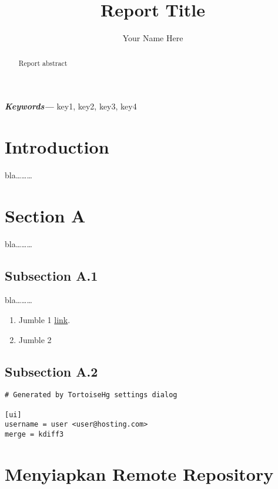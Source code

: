 \documentclass[]{article}
\title{Report Title}
\author{Your Name Here}
\providecommand{\keywords}[1]{\textbf{\textit{Keywords---}} #1}
\begin{document}
\maketitle
\begin{abstract}
  Report abstract
\end{abstract}
\keywords{key1, key2, key3, key4}

\tableofcontents
\newpage

\section{Introduction}
bla\dots\dots\dots

\section{Section A}
bla\dots\dots\dots

\subsection{Subsection A.1}
bla\dots\dots\dots
\begin{enumerate}
  \item Jumble 1
    \href{http://tortoisehg.bitbucket.org/download/}{link}.
  \item Jumble 2
\end{enumerate}

\subsection{Subsection A.2}

\begin{lstlisting}[style=bash]
# Generated by TortoiseHg settings dialog

[ui]
username = user <user@hosting.com>
merge = kdiff3
\end{lstlisting}

\clearpage
\section{Menyiapkan Remote Repository}
\end{document}
